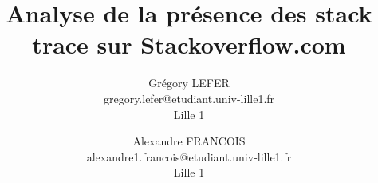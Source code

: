 \documentclass[11pt]{article}
\title{\vspace{\fill}Analyse de la présence des stack trace sur Stackoverflow.com \vspace{\fill}}
\author{
  Grégory LEFER\\
  gregory.lefer@etudiant.univ-lille1.fr\\
  Lille 1
\and
  Alexandre FRANCOIS\\
  alexandre1.francois@etudiant.univ-lille1.fr\\
  Lille 1
}
\begin{document}
\maketitle

\clearpage
\renewcommand{\contentsname}{Sommaire}
\tableofcontents

\clearpage






\clearpage
\listoffigures 

\end{document}
